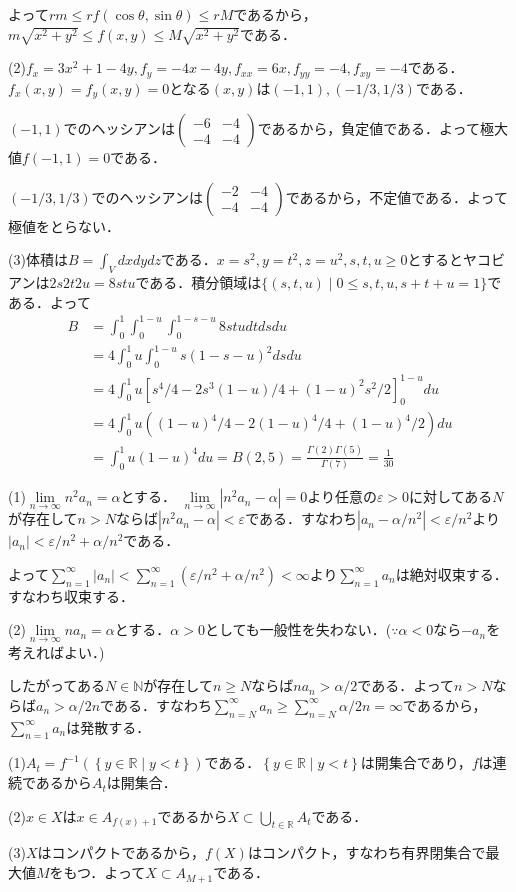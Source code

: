 \documentclass[
		book,
		head_space=20mm,
		foot_space=20mm,
		gutter=10mm,
		line_length=190mm
]{jlreq}
\begin{document}
よって$rm \le rf(\cos \theta,\sin \theta)\le rM$であるから，$m\sqrt{x^2+y^2}\le f(x,y)\le M\sqrt{x^2+y^2}$である．

(2)$f_x=3x^2+1-4y,f_y=-4x-4y,f_{xx}=6x,f_{yy}=-4,f_{xy}=-4$である．
$f_x(x,y)=f_y(x,y)=0$となる$(x,y)$は$(-1,1),(-1/3,1/3)$である．

$(-1,1)$でのヘッシアンは$\begin{pmatrix}
    -6 & -4\\
    -4 & -4
    \end{pmatrix}$であるから，負定値である．よって極大値$f(-1,1)=0$である．

$(-1/3,1/3)$でのヘッシアンは$\begin{pmatrix}
    -2 & -4\\
    -4 & -4
    \end{pmatrix}$であるから，不定値である．よって極値をとらない．

(3)体積は$B=\int_V dxdydz$である．$x=s^2,y=t^2,z=u^2,s,t,u\ge 0$とするとヤコビアンは$2s2t2u=8stu$である．積分領域は$\{ (s,t,u)\mid 0\le s,t,u,s+t+u=1\}$である．よって
\begin{align}
    B&=\int_0^1\int_0^{1-u}\int_0^{1-s-u}8stu dtdsdu\\
    &=4 \int_0^1 u \int_0^{1-u}s(1-s-u)^2dsdu\\
    &=4 \int_0^1 u[s^4/4-2s^3(1-u)/4+(1-u)^2s^2/2]_0^{1-u} du \\
    &=4 \int_0^1 u((1-u)^4/4-2(1-u)^4/4+(1-u)^4/2)du\\
    &=\int_0^1 u(1-u)^4du=B(2,5)=\frac{\Gamma(2)\Gamma(5)}{\Gamma(7)}=\frac{1}{30}
\end{align}

(1)$\lim\limits_{n\to \infty}n^2a_n=\alpha$とする．
$\lim\limits_{n\to \infty}|n^2a_n-\alpha|=0$より任意の$\varepsilon>0$に対してある$N$が存在して$n>N$ならば$|n^2a_n-\alpha|<\varepsilon$である．すなわち$|a_n-\alpha/n^2|<\varepsilon/n^2$より$|a_n|<\varepsilon/n^2+\alpha/n^2$である．

よって$\sum\limits_{n=1}^{\infty} |a_n|<\sum\limits_{n=1}^{\infty} (\varepsilon/n^2+\alpha/n^2)<\infty$より$\sum\limits_{n=1}^{\infty} a_n$は絶対収束する．すなわち収束する．

(2)$\lim\limits_{n\to \infty}na_n=\alpha$とする．$\alpha>0$としても一般性を失わない．($\because \alpha<0$なら$-a_n$を考えればよい．)

したがってある$N\in \mathbb{N}$が存在して$n\ge N$ならば$na_n>\alpha/2$である．よって$n>N$ならば$a_n>\alpha/2n$である．すなわち$\sum\limits_{n=N}^{\infty} a_n\ge \sum\limits_{n=N}^{\infty} \alpha/2n =\infty$であるから，$\sum\limits_{n=1}^{\infty} a_n$は発散する．

(1)$A_t=f^{-1}(\left\{ y\in \mathbb{R}\mid y < t \right\})$である．$\left\{ y\in \mathbb{R}\mid y < t \right\}$は開集合であり，$f$は連続であるから$A_t$は開集合．

(2)$x\in X$は$x\in A_{f(x)+1}$であるから$X \subset \bigcup_{t\in \mathbb{R}} A_t$である．

(3)$X$はコンパクトであるから，$f(X)$はコンパクト，すなわち有界閉集合で最大値$M$をもつ．よって$X\subset A_{M+1}$である．
\end{document}
